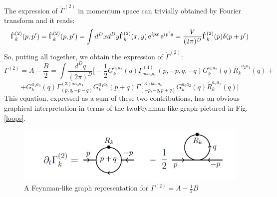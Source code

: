 \ \\


The expression of $\dot{\Gamma}^{(2)}$ in momentum space can trivially obtained by Fourier transform and it reads:
\begin{equation}
\dot{\Gamma}_k^{(2)} (p, p') = \dot{\Gamma}_k^{(2)} (p, p') =\int d^Dxd^Dy\dot{\Gamma}_k^{(2)} (x, y)\operatorname{e}^{ipx}\operatorname{e}^{ip'y} = \frac{V}{(2\pi)^D}\dot{\Gamma}_k^{(2)} (p) \delta(p + p')
\end{equation}
So, putting all together,  we obtain  the expression of $\dot{\Gamma}^{(2)}$:
\begin{equation}
\Gamma^{(2)} = A - \frac{B}{2} = \int \frac{d^Dq}{(2\pi)^D}\Bigg[  -\frac{1}{2} G^{a_1a_3}_k(q)\Gamma_{aba_3a_6}^{(4)}(p,-p,q,-q) G^{a_6a_2}_k(q) \dot{R_k}^{a_2a_1}(q) + 
\end{equation}
\begin{equation}
+ {G}_k^{a_1a_3}(q) {\Gamma}^{(3)aa_3a_4}_{(p, q, -p-q)} {G}_k^{a_4a_5}(p + q){\Gamma}^{(3)ba_5a_6}_{(-p,-q,p+q)}{G}_k^{a_6a_2}(q)\dot{R}^{a_2a_1}_k(q)\Bigg] 
\end{equation}
This equation, expressed as a sum of these two contributions, has an obvious graphical interpretation in terms of the twoFeynman-like graph pictured in Fig.\ref{loops}.

\begin{figure}
\begin{center}
\includegraphics[scale=0.4]{Immagini/grafiloop.png}
\caption{A Feynman-like graph representation for $\Gamma^{(2)} = A - \frac{1}{2} B$}
\label{fig:loops}
\end{center}
\end{figure}


